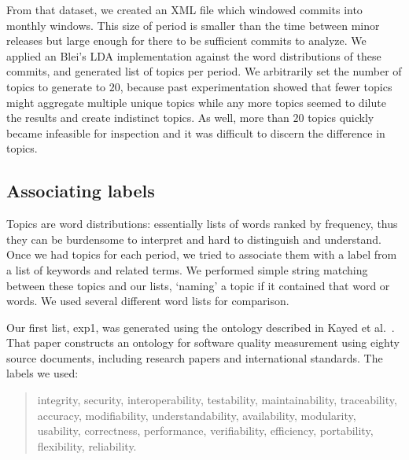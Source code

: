 \documentclass{acm_proc_article-sp}
\begin{document}
From that dataset, we created an XML file which windowed commits into
monthly windows. This size of period is smaller than the time between minor releases but large enough for there to be sufficient commits to analyze. We applied an Blei's LDA implementation against the word distributions of these commits, and generated list of topics per period. 
We arbitrarily set the number of topics to generate to $20$, because past experimentation showed that fewer topics might aggregate multiple unique topics while any more topics seemed to dilute the results and create indistinct topics. As well, more than $20$ topics quickly became infeasible for inspection and it was difficult to discern the difference in topics.

\subsection{Associating labels}

Topics are word distributions: essentially lists of words ranked by frequency, thus they can be burdensome to interpret and hard to distinguish and understand.
Once we had topics for each period, we tried to associate them with a label from a list of keywords and related terms. We performed simple string matching between these topics and our lists, `naming' a topic if it contained that word or words. We used several different word lists for comparison. 

Our first list, \textsf{exp1}, was generated using the ontology described in Kayed et al.~\cite{5072519}. That paper constructs an ontology for software quality measurement using eighty source documents, including research papers and international standards. The labels we used:
\begin{quotation}
\small \noindent \textsf{
integrity, security,
interoperability, testability, maintainability, traceability,
accuracy, modifiability, understandability, availability, modularity,
usability, correctness, performance, verifiability, efficiency,
portability, flexibility, reliability.
}
\end{quotation}
\end{document}

